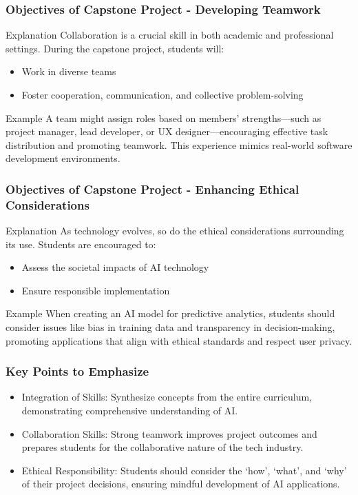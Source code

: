 \documentclass[aspectratio=169]{beamer}
\begin{document}
\begin{frame}[fragile]
    \frametitle{Objectives of Capstone Project - Developing Teamwork}
    \begin{block}{Explanation}
        Collaboration is a crucial skill in both academic and professional settings. During the capstone project, students will:
        \begin{itemize}
            \item Work in diverse teams
            \item Foster cooperation, communication, and collective problem-solving
        \end{itemize}
    \end{block}
    \begin{block}{Example}
        A team might assign roles based on members’ strengths—such as project manager, lead developer, or UX designer—encouraging effective task distribution and promoting teamwork. This experience mimics real-world software development environments.
    \end{block}
\end{frame}

\begin{frame}[fragile]
    \frametitle{Objectives of Capstone Project - Enhancing Ethical Considerations}
    \begin{block}{Explanation}
        As technology evolves, so do the ethical considerations surrounding its use. Students are encouraged to:
        \begin{itemize}
            \item Assess the societal impacts of AI technology
            \item Ensure responsible implementation
        \end{itemize}
    \end{block}
    \begin{block}{Example}
        When creating an AI model for predictive analytics, students should consider issues like bias in training data and transparency in decision-making, promoting applications that align with ethical standards and respect user privacy.
    \end{block}
\end{frame}

\begin{frame}[fragile]
    \frametitle{Key Points to Emphasize}
    \begin{itemize}
        \item Integration of Skills: Synthesize concepts from the entire curriculum, demonstrating comprehensive understanding of AI.
        \item Collaboration Skills: Strong teamwork improves project outcomes and prepares students for the collaborative nature of the tech industry.
        \item Ethical Responsibility: Students should consider the ‘how’, ‘what’, and ‘why’ of their project decisions, ensuring mindful development of AI applications.
    \end{itemize}
\end{frame}
\end{document}
